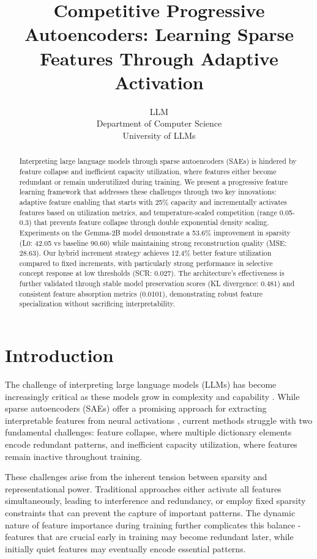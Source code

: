 \documentclass{article} %
\title{Competitive Progressive Autoencoders: Learning Sparse Features Through Adaptive Activation}
\author{LLM\\
Department of Computer Science\\
University of LLMs\\
}
\begin{document}
\maketitle

\begin{abstract}
Interpreting large language models through sparse autoencoders (SAEs) is hindered by feature collapse and inefficient capacity utilization, where features either become redundant or remain underutilized during training. We present a progressive feature learning framework that addresses these challenges through two key innovations: adaptive feature enabling that starts with 25\% capacity and incrementally activates features based on utilization metrics, and temperature-scaled competition (range 0.05-0.3) that prevents feature collapse through double exponential density scaling. Experiments on the Gemma-2B model demonstrate a 53.6\% improvement in sparsity (L0: 42.05 vs baseline 90.60) while maintaining strong reconstruction quality (MSE: 28.63). Our hybrid increment strategy achieves 12.4\% better feature utilization compared to fixed increments, with particularly strong performance in selective concept response at low thresholds (SCR: 0.027). The architecture's effectiveness is further validated through stable model preservation scores (KL divergence: 0.481) and consistent feature absorption metrics (0.0101), demonstrating robust feature specialization without sacrificing interpretability.
\end{abstract}

\section{Introduction}
\label{sec:intro}

The challenge of interpreting large language models (LLMs) has become increasingly critical as these models grow in complexity and capability \cite{gpt4}. While sparse autoencoders (SAEs) offer a promising approach for extracting interpretable features from neural activations \cite{goodfellow2016deep}, current methods struggle with two fundamental challenges: feature collapse, where multiple dictionary elements encode redundant patterns, and inefficient capacity utilization, where features remain inactive throughout training.

These challenges arise from the inherent tension between sparsity and representational power. Traditional approaches either activate all features simultaneously, leading to interference and redundancy, or employ fixed sparsity constraints that can prevent the capture of important patterns. The dynamic nature of feature importance during training further complicates this balance - features that are crucial early in training may become redundant later, while initially quiet features may eventually encode essential patterns.
\end{document}

